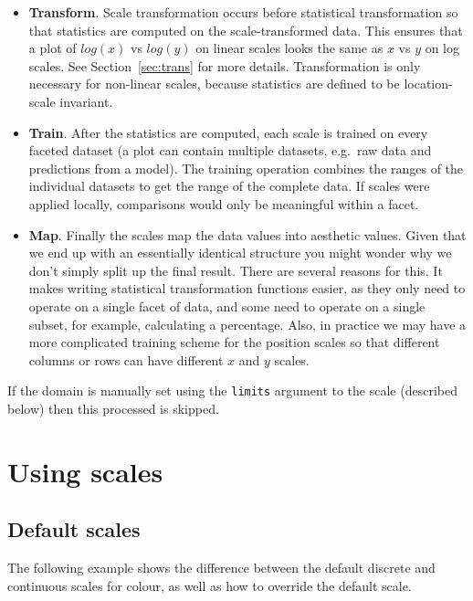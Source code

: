 \begin{itemize}
	\item  {\bf Transform}. Scale transformation occurs before statistical transformation so that statistics are computed on the scale-transformed data.  This ensures that a plot of $log(x)$ vs $log(y)$ on linear scales looks the same as $x$ vs $y$ on log scales.  See Section~\ref{sec:trans} for more details. Transformation is only necessary for non-linear scales, because statistics are defined to be location-scale invariant.

	\item {\bf Train}. After the statistics are computed, each scale is trained on every faceted dataset (a plot can contain multiple datasets, e.g.\ raw data and predictions from a model).  The training operation combines the ranges of the individual datasets to get the range of the complete data.  If scales were applied locally, comparisons would only be meaningful within a facet.

	\item {\bf Map}. Finally the scales map the data values into aesthetic values. Given that we end up with an essentially identical structure you might wonder why we don't simply split up the final result.  There are several reasons for this.  It makes writing statistical transformation functions easier, as they only need to operate on a single facet of data, and some need to operate on a single subset, for example, calculating a percentage.  Also, in practice we may have a more complicated training scheme for the position scales so that different columns or rows can have different $x$ and $y$ scales.  
	
\end{itemize}

If the domain is manually set using the {\tt limits} argument to the scale (described below) then this processed is skipped.

\section{Using scales}

\subsection{Default scales}
\label{sub:default_scales}

The following example shows the difference between the default discrete and continuous scales for colour, as well as how to override the default scale.

